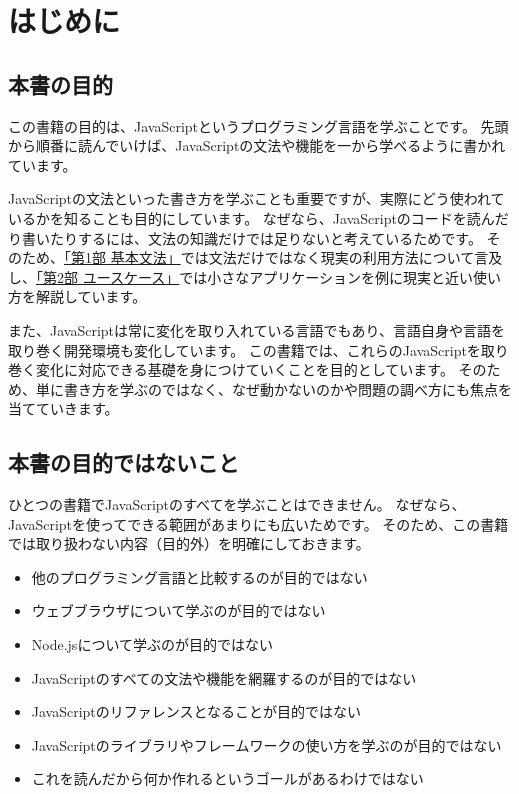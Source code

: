 \hypertarget{prolog}{%
\chapter*{はじめに}\label{prolog}}
\thispagestyle{frontheadings}

\hypertarget{do}{%
\section*{本書の目的}\label{do}}

この書籍の目的は、JavaScriptというプログラミング言語を学ぶことです。
先頭から順番に読んでいけば、JavaScriptの文法や機能を一から学べるように書かれています。

JavaScriptの文法といった書き方を学ぶことも重要ですが、実際にどう使われているかを知ることも目的にしています。
なぜなら、JavaScriptのコードを読んだり書いたりするには、文法の知識だけでは足りないと考えているためです。
そのため、\hyperlink{basic-grammar}{「第1部 基本文法」}では文法だけではなく現実の利用方法について言及し、\hyperlink{use-case}{「第2部 ユースケース」}では小さなアプリケーションを例に現実と近い使い方を解説しています。

また、JavaScriptは常に変化を取り入れている言語でもあり、言語自身や言語を取り巻く開発環境も変化しています。
この書籍では、これらのJavaScriptを取り巻く変化に対応できる基礎を身につけていくことを目的としています。
そのため、単に書き方を学ぶのではなく、なぜ動かないのかや問題の調べ方にも焦点を当てていきます。

\hypertarget{do-not}{%
\section*{本書の目的ではないこと}\label{do-not}}

ひとつの書籍でJavaScriptのすべてを学ぶことはできません。
なぜなら、JavaScriptを使ってできる範囲があまりにも広いためです。
そのため、この書籍では取り扱わない内容（目的外）を明確にしておきます。

\begin{itemize}
\item
  他のプログラミング言語と比較するのが目的ではない
\item
  ウェブブラウザについて学ぶのが目的ではない
\item
  Node.jsについて学ぶのが目的ではない
\item
  JavaScriptのすべての文法や機能を網羅するのが目的ではない
\item
  JavaScriptのリファレンスとなることが目的ではない
\item
  JavaScriptのライブラリやフレームワークの使い方を学ぶのが目的ではない
\item
  これを読んだから何か作れるというゴールがあるわけではない
\end{itemize}

